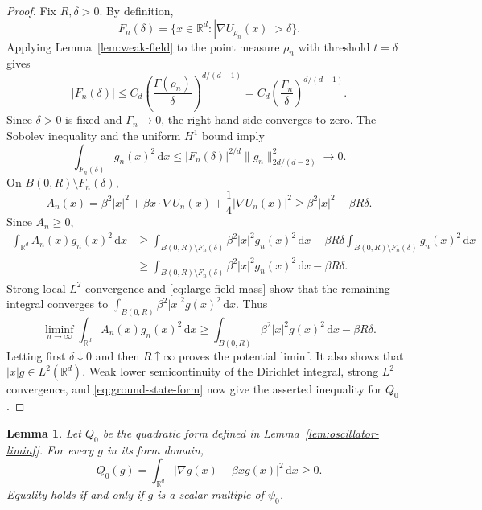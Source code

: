 \documentclass[12pt,reqno,letterpaper]{amsart}
\newtheorem{lemma}[theorem]{Lemma}
\theoremstyle{definition}
\theoremstyle{remark}
\numberwithin{equation}{section}
\newcommand{\R}{\mathbb R}
\newcommand{\dd}{\,\mathrm d}
\newcommand{\be}{\beta}
\begin{document}
\begin{proof}
Fix \(R,\delta>0\). By definition,
\[
 F_n(\delta)
 =\{x\in\R^d:|\nabla U_{\rho_n}(x)|>\delta\}.
\]
Applying Lemma~\ref{lem:weak-field} to the point measure \(\rho_n\) with
threshold \(t=\delta\) gives
\[
 |F_n(\delta)|
 \le
 C_d\left(\frac{\Gamma(\rho_n)}{\delta}\right)^{d/(d-1)}
 =
 C_d\left(\frac{\Gamma_n}{\delta}\right)^{d/(d-1)}.
\]
Since \(\delta>0\) is fixed and \(\Gamma_n\to0\), the right-hand side
converges to zero.
The Sobolev inequality and the uniform \(H^1\) bound imply
\begin{equation}\label{eq:large-field-mass}
 \int_{F_n(\delta)}g_n(x)^2\dd x
 \le |F_n(\delta)|^{2/d}\|g_n\|_{2d/(d-2)}^2
 \longrightarrow0.
\end{equation}
On \(B(0,R)\setminus F_n(\delta)\),
\[
 A_n(x)=\be^2|x|^2+\be x\cdot\nabla U_n(x)
 +\frac14|\nabla U_n(x)|^2
 \ge\be^2|x|^2-\be R\delta.
\]
Since \(A_n\ge0\),
\begin{align*}
 \int_{\R^d}A_n(x)g_n(x)^2\dd x
 &\ge\int_{B(0,R)\setminus F_n(\delta)}
   \be^2|x|^2g_n(x)^2\dd x-\be R\delta
   \int_{B(0,R)\setminus F_n(\delta)}g_n(x)^2\dd x\\
 &\ge\int_{B(0,R)\setminus F_n(\delta)}
   \be^2|x|^2g_n(x)^2\dd x-\be R\delta.
\end{align*}
Strong local \(L^2\) convergence and \eqref{eq:large-field-mass} show that
the remaining integral converges to
\(\int_{B(0,R)}\be^2|x|^2g(x)^2\dd x\).  Thus
\[
 \liminf_{n\to\infty}\int_{\R^d}A_n(x)g_n(x)^2\dd x
 \ge\int_{B(0,R)}\be^2|x|^2g(x)^2\dd x-\be R\delta.
\]
Letting first \(\delta\downarrow0\) and then \(R\uparrow\infty\) proves
the potential liminf.  It also shows that \(|x|g\in L^2(\R^d)\).  Weak
lower semicontinuity of the Dirichlet integral, strong \(L^2\) convergence,
and \eqref{eq:ground-state-form} now give the asserted inequality for
\(Q_0\).
\end{proof}

\begin{lemma}\label{lem:oscillator-kernel}
Let \(Q_0\) be the quadratic form defined in
Lemma~\ref{lem:oscillator-liminf}.  For every \(g\) in its form domain,
\[
 Q_0(g)=\int_{\R^d}|\nabla g(x)+\be xg(x)|^2\dd x\ge0.
\]
Equality holds if and only if \(g\) is a scalar multiple of \(\psi_0\).
\end{lemma}
\end{document}
